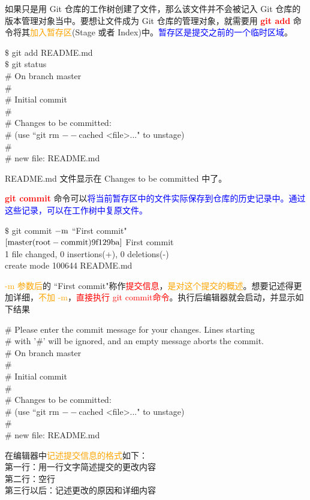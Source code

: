 \documentclass[12pt,a4paper]{article}
\begin{document}
如果只是用 Git 仓库的工作树创建了文件，那么该文件并不会被记入 Git 仓库的版本管理对象当中。要想让文件成为 Git 仓库的管理对象，就需要用 \textcolor{red}{\bf git add} 命令将其\textcolor{orange}{加入暂存区}(Stage 或者 Index)中。\textcolor{blue}{暂存区是提交之前的一个临时区域}。
\begin{tcolorbox}[colback=green!5,colframe=green!40!black,title= ]
$\$$ git add README.md \\
$\$$ git status \\
$\#$ On branch master \\
$\#$ \\
$\#$ Initial commit \\
$\#$ \\
$\#$ Changes to be committed: \\
$\#$ (use ``git rm $--$cached <file>..." to unstage) \\
$\#$ \\
$\#$ new file: README.md 
\end{tcolorbox}
README.md 文件显示在 Changes to be committed 中了。

\textcolor{red}{\bf git commit }命令可以\textcolor{blue}{将当前暂存区中的文件实际保存到仓库的历史记录中。通过这些记录，可以在工作树中复原文件。}
\begin{tcolorbox}[colback=green!5,colframe=green!40!black,title= ]
$\$$ git commit $\rm -m$ ``First commit" \\
$\rm [master (root-commit) 9f129ba]$ First commit \\
1 file changed, 0 insertions(+), 0 deletions(-) \\
create mode 100644 README.md 
\end{tcolorbox}
\textcolor{orange}{-m 参数后}的 ``First commit"称作\textcolor{red}{提交信息}，\textcolor{orange}{是对这个提交的概述}。想要记述得更加详细，\textcolor{orange}{不加 -m}，\textcolor{red}{直接执行 git commit命令}。执行后编辑器就会启动，并显示如下结果
\begin{tcolorbox}[colback=green!5,colframe=green!40!black,title= ]
$\#$ Please enter the commit message for your changes. Lines starting \\
$\#$ with '$\#$' will be ignored, and an empty message aborts the commit. \\
$\#$ On branch master \\
$\#$ \\
$\#$ Initial commit \\
$\#$ \\
$\#$ Changes to be committed: \\
$\#$ (use ``git rm $--$cached <file>..." to unstage) \\
$\#$ \\
$\#$ new file: README.md 
\end{tcolorbox}
在编辑器中\textcolor{orange}{记述提交信息的格式}如下： \\
第一行：用一行文字简述提交的更改内容 \\
第二行：空行 \\
第三行以后：记述更改的原因和详细内容 
\end{document}
